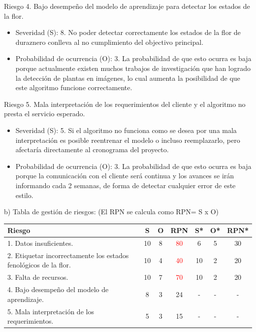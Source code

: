 \documentclass[
11pt, %
]{charter}
\begin{document}
Riesgo 4. Bajo desempeño del modelo de aprendizaje para detectar los estados de la flor.

\begin{itemize}
\item Severidad (S): 8. No poder detectar correctamente los estados de la flor de duraznero conlleva al no cumplimiento del objectivo principal. 

\item Probabilidad de ocurrencia (O): 3. La probabilidad de que esto ocurra es baja porque actualmente existen muchos trabajos de investigación que han logrado la detección de plantas en imágenes, lo cual aumenta la posibilidad de que este algoritmo funcione correctamente. 
\end{itemize}

Riesgo 5. Mala interpretación de los requerimientos del cliente y el algoritmo no presta el servicio esperado.

\begin{itemize}
\item Severidad (S): 5. Si el algoritmo no funciona como se desea por una mala interpretación es posible reentrenar el modelo o incluso reemplazarlo, pero afectaría directamente al cronograma del proyecto. 

\item Probabilidad de ocurrencia (O): 3. La probabilidad de que esto ocurra es baja porque la comunicación con el cliente será continua y los avances se irán informando cada 2 semanas, de forma de detectar cualquier error de este estilo. 
\end{itemize}

b) Tabla de gestión de riesgos:      (El RPN se calcula como RPN= S x O)

\begin{table}[htpb]
\centering
\begin{tabularx}{\linewidth}{@{}|X|c|c|c|c|c|c|@{}}
\hline
\rowcolor[HTML]{C0C0C0} 
Riesgo & S & O & RPN & S* & O* & RPN* \\ \hline
1. Datos insuficientes.      &  10 & 8 &  \textcolor{red}{80}  &  6  &  5  &   30   \\ \hline
2. Etiquetar incorrectamente los estados fenológicos de la flor.      &  10 & 4  &     \textcolor{red}{40} & 10   & 2   &  20    \\ \hline
3. Falta de recursos.       &  10 & 7  &  \textcolor{red}{70}   &  10  & 2   & 20      \\ \hline
4. Bajo desempeño del modelo de aprendizaje.       &  8 & 3  & 24  &  -  &  -  &     - \\ \hline
5. Mala interpretación de los requerimientos.       & 5  & 3  &  15   &  -  &   - &     - \\ \hline
\end{tabularx}%
\end{table}
\end{document}
